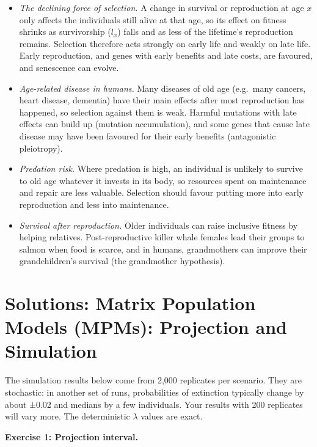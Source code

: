 \documentclass[
  a4paper]{book}
\providecommand{\tightlist}{%
  \setlength{\itemsep}{0pt}\setlength{\parskip}{0pt}}
\begin{document}
\begin{itemize}
\tightlist
\item
  \emph{The declining force of selection.} A change in survival or reproduction at age \(x\) only affects the individuals still alive at that age, so its effect on fitness shrinks as survivorship (\(l_x\)) falls and as less of the lifetime's reproduction remains. Selection therefore acts strongly on early life and weakly on late life. Early reproduction, and genes with early benefits and late costs, are favoured, and senescence can evolve.
\item
  \emph{Age-related disease in humans.} Many diseases of old age (e.g.~many cancers, heart disease, dementia) have their main effects after most reproduction has happened, so selection against them is weak. Harmful mutations with late effects can build up (mutation accumulation), and some genes that cause late disease may have been favoured for their early benefits (antagonistic pleiotropy).
\item
  \emph{Predation risk.} Where predation is high, an individual is unlikely to survive to old age whatever it invests in its body, so resources spent on maintenance and repair are less valuable. Selection should favour putting more into early reproduction and less into maintenance.
\item
  \emph{Survival after reproduction.} Older individuals can raise inclusive fitness by helping relatives. Post-reproductive killer whale females lead their groups to salmon when food is scarce, and in humans, grandmothers can improve their grandchildren's survival (the grandmother hypothesis).
\end{itemize}

\section{Solutions: Matrix Population Models (MPMs): Projection and Simulation}\label{solutions-matrix-population-models-mpms-projection-and-simulation}

The simulation results below come from 2,000 replicates per scenario. They are stochastic: in another set of runs, probabilities of extinction typically change by about ±0.02 and medians by a few individuals. Your results with 200 replicates will vary more. The deterministic \(\lambda\) values are exact.

\textbf{Exercise 1: Projection interval.}
\end{document}
